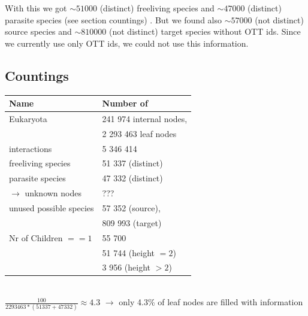       With this we got $\sim 51000$ (distinct) freeliving species and $\sim 47000$ (distinct) parasite 
        species (see section countings) . But we found also  $\sim 57000$ (not 
        distinct) source species and $\sim 810000$ (not distinct) target species without OTT ids. 
        Since we currently use only OTT ids, we could not use this information. \\

    \subsection{Countings}
      \begin{center}
        \begin{tabular}{ | l | l | }
          \hline
          Name & Number of \\
          \hline \hline
          Eukaryota & 241 974 internal nodes, \\
          & 2 293 463 leaf nodes \\ \hline
          interactions & 5 346 414 \\ \hline
          freeliving species & 51 337 (distinct) \\ \hline
          parasite species &  47 332 (distinct) \\ \hline
          $\rightarrow$ unknown nodes & ??? \\ \hline
          unused possible species & 57 352 (source), \\
          & 809 993 (target) \\
          \hline
          Nr of Children $== 1$ & 55 700 \\
          & 51 744 (height $=2$) \\
          & 3 956 (height $>2$) \\ \hline
        \end{tabular}
      \end{center}
       \\
      $\frac{100}{2293463 * (51337 + 47332)} \approx 4.3$ $\rightarrow$ only 4.3\% of leaf nodes are 
        filled with information

